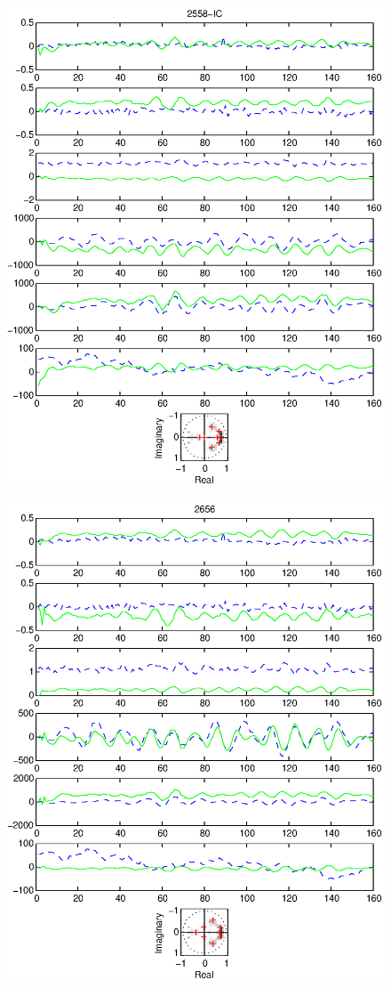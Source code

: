 \documentclass{article}
\begin{document}
\begin{figure}[htb!]\centering
\includegraphics{2558_ic.eps}
\end{figure}\clearpage
\begin{figure}[htb!]\centering
\includegraphics{2656.eps}
\end{figure}\clearpage
\end{document}
